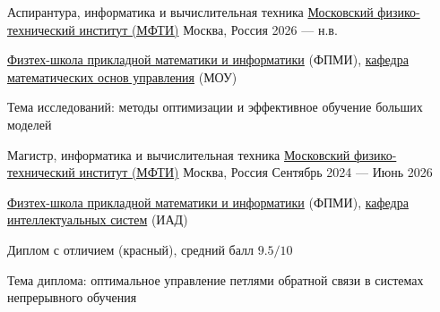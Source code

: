 
\begin{cventries}

  \cventry
    {Аспирантура, информатика и вычислительная техника} %
    {\href{https://en.wikipedia.org/wiki/Moscow_Institute_of_Physics_and_Technology}{Московский физико-технический институт (МФТИ)}} %
    {Москва, Россия} %
    {2026 — н.в.} %
    {
      \begin{cvitems}
        \item {\href{https://pk.mipt.ru/schools/fpmi/}{Физтех-школа прикладной математики и информатики} (ФПМИ), \href{https://new.mipt.ru/education/basic-departments/kafedra-matematicheskikh-osnov-upravleniya}{кафедра математических основ управления} (МОУ)}
        \item {Тема исследований: методы оптимизации и эффективное обучение больших моделей}
      \end{cvitems}
    }

  \cventry
    {Магистр, информатика и вычислительная техника} %
    {\href{https://en.wikipedia.org/wiki/Moscow_Institute_of_Physics_and_Technology}{Московский физико-технический институт (МФТИ)}} %
    {Москва, Россия} %
    {Сентябрь 2024 — Июнь 2026} %
    {
      \begin{cvitems}
        \item {\href{https://pk.mipt.ru/schools/fpmi/}{Физтех-школа прикладной математики и информатики} (ФПМИ), \href{https://intsystems.github.io}{кафедра интеллектуальных систем} (ИАД)}
        \item {Диплом с отличием (красный), средний балл $9.5/10$}
        \item {Тема диплома: оптимальное управление петлями обратной связи в системах непрерывного обучения}
      \end{cvitems}
    }


\end{cventries}
